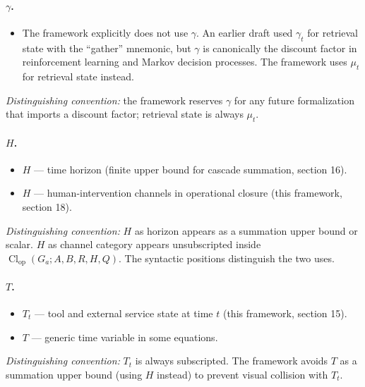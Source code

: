 \documentclass[11pt]{article}
\DeclareMathOperator{\Cl}{Cl}
\begin{document}
\paragraph{$\gamma$.}
\begin{itemize}
\item The framework explicitly does not use $\gamma$. An earlier draft used $\gamma_t$ for retrieval state with the ``gather'' mnemonic, but $\gamma$ is canonically the discount factor in reinforcement learning and Markov decision processes. The framework uses $\mu_t$ for retrieval state instead.
\end{itemize}
\textit{Distinguishing convention:} the framework reserves $\gamma$ for any future formalization that imports a discount factor; retrieval state is always $\mu_t$.

\paragraph{$H$.}
\begin{itemize}
\item $H$ --- time horizon (finite upper bound for cascade summation, section 16).
\item $H$ --- human-intervention channels in operational closure (this framework, section 18).
\end{itemize}
\textit{Distinguishing convention:} $H$ as horizon appears as a summation upper bound or scalar. $H$ as channel category appears unsubscripted inside $\Cl_{\text{op}}(G_a; A, B, R, H, Q)$. The syntactic positions distinguish the two uses.

\paragraph{$T$.}
\begin{itemize}
\item $T_t$ --- tool and external service state at time $t$ (this framework, section 15).
\item $T$ --- generic time variable in some equations.
\end{itemize}
\textit{Distinguishing convention:} $T_t$ is always subscripted. The framework avoids $T$ as a summation upper bound (using $H$ instead) to prevent visual collision with $T_t$.
\end{document}
